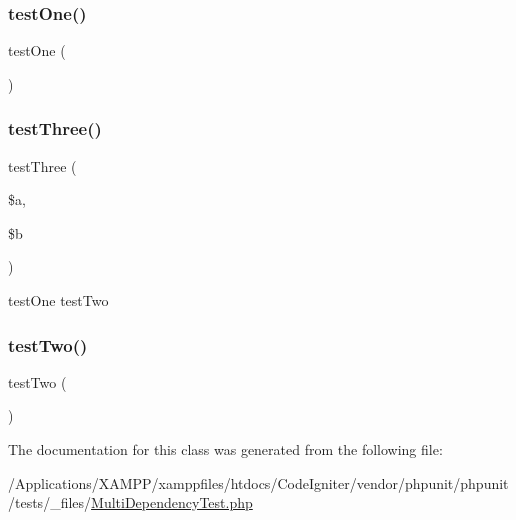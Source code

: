 \subsubsection{\texorpdfstring{test\+One()}{testOne()}}
{\footnotesize\ttfamily test\+One (\begin{DoxyParamCaption}{ }\end{DoxyParamCaption})}

\mbox{\label{class_multi_dependency_test_aab42714bcbe232d78a5de48238d2fd77}} 
\subsubsection{\texorpdfstring{test\+Three()}{testThree()}}
{\footnotesize\ttfamily test\+Three (\begin{DoxyParamCaption}\item[{}]{\$a,  }\item[{}]{\$b }\end{DoxyParamCaption})}

test\+One  test\+Two \mbox{\label{class_multi_dependency_test_a4fb9974ce113d5d1db8075e0db0dc9b6}} 
\subsubsection{\texorpdfstring{test\+Two()}{testTwo()}}
{\footnotesize\ttfamily test\+Two (\begin{DoxyParamCaption}{ }\end{DoxyParamCaption})}



The documentation for this class was generated from the following file\+:\begin{DoxyCompactItemize}
\item 
/\+Applications/\+X\+A\+M\+P\+P/xamppfiles/htdocs/\+Code\+Igniter/vendor/phpunit/phpunit/tests/\+\_\+files/\mbox{\hyperlink{_multi_dependency_test_8php}{Multi\+Dependency\+Test.\+php}}\end{DoxyCompactItemize}
